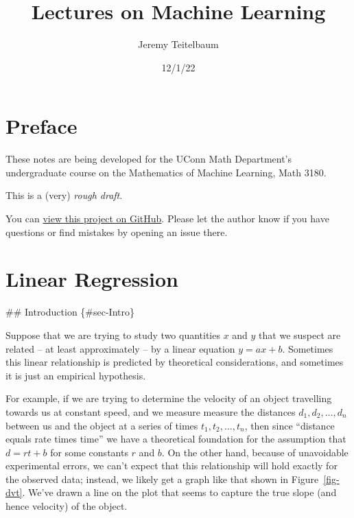 \documentclass[
  11pt,
  letterpaper,
]{scrbook}
\title{Lectures on Machine Learning}
\author{Jeremy Teitelbaum}
\date{12/1/22}
\newcommand{\df}[1]{\frac{\partial}{\partial #1}}
\newcommand{\R}{\mathbf{R}}
\renewcommand*\contentsname{Table of contents}
\newcommand\contentsname{Table of contents}
\theoremstyle{plain}
\theoremstyle{plain}
\theoremstyle{remark}
\begin{document}
\frontmatter
\maketitle
\ifdefined\Shaded\renewenvironment{Shaded}{\begin{tcolorbox}[breakable, boxrule=0pt, borderline west={3pt}{0pt}{shadecolor}, interior hidden, frame hidden, enhanced, sharp corners]}{\end{tcolorbox}}\fi

\renewcommand*\contentsname{Table of contents}
{
\setcounter{tocdepth}{2}
\tableofcontents
}
\mainmatter
{}

\hypertarget{preface}{%
\chapter*{Preface}\label{preface}}


These notes are being developed for the UConn Math Department's
undergraduate course on the Mathematics of Machine Learning, Math 3180.

This is a (very) \emph{rough draft}.

You can
\href{https://github.com/jeremy9959/Mathematics-for-Machine-Learning}{view
this project on GitHub}. Please let the author know if you have
questions or find mistakes by opening an issue there.


\hypertarget{sec-LinearRegression}{%
\chapter{Linear Regression}\label{sec-LinearRegression}}

\[\newcommand{\df}[1]{\frac{\partial}{\partial #1}}\]
\[\newcommand{\R}{\mathbf{R}}\] \#\# Introduction \{\#sec-Intro\}

Suppose that we are trying to study two quantities \(x\) and \(y\) that
we suspect are related -- at least approximately -- by a linear equation
\(y=ax+b\). Sometimes this linear relationship is predicted by
theoretical considerations, and sometimes it is just an empirical
hypothesis.

For example, if we are trying to determine the velocity of an object
travelling towards us at constant speed, and we measure measure the
distances \(d_1, d_2, \ldots, d_n\) between us and the object at a
series of times \(t_1, t_2, \ldots, t_n\), then since ``distance equals
rate times time'' we have a theoretical foundation for the assumption
that \(d=rt+b\) for some constants \(r\) and \(b\). On the other hand,
because of unavoidable experimental errors, we can't expect that this
relationship will hold exactly for the observed data; instead, we likely
get a graph like that shown in Figure~\ref{fig-dvt}. We've drawn a line
on the plot that seems to capture the true slope (and hence velocity) of
the object.
\end{document}
